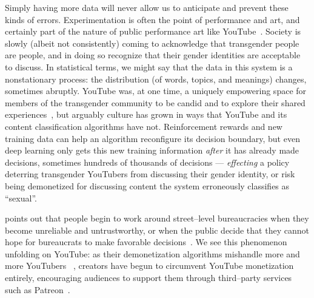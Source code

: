 \documentclass[street-level_algorithms]{subfiles}
\begin{document}
Simply having more data will never allow us to anticipate and prevent these kinds of errors.
Experimentation is often the point of performance and art, and
certainly part of the nature of public performance art like YouTube~\cite{cohen1998radical,mason1992street}.
Society is slowly (albeit not consistently) coming to acknowledge that transgender people are people,
and in doing so recognize that their gender identities are acceptable to discuss.
In statistical terms, we might say that
the data in this system is a nonstationary process:
the distribution (of words, topics, and meanings) changes, sometimes abruptly.
YouTube was, at one time, a uniquely empowering space for members of the transgender community
to be candid and to explore their shared experiences~\cite{ONeill2014,raun2016out}, but
arguably culture has grown in ways that YouTube and its content classification algorithms have not.
Reinforcement rewards and new training data can help an algorithm reconfigure its decision boundary, but
even deep learning only gets this new training information \textit{after}
it has already made decisions, sometimes hundreds of thousands of decisions
--- \textit{effecting} a policy deterring transgender YouTubers from discussing their gender identity,
or risk being demonetized for discussing content the system erroneously classifies as ``sexual''.

\citeauthor{lipsky1983street} points out that
people begin to work around street--level bureaucracies when they become unreliable and untrustworthy, or
when the public decide that they cannot hope for bureaucrats to make favorable decisions~\cite{lipsky1983street}.
We see this phenomenon unfolding on YouTube:
as their demonetization algorithms mishandle more and more YouTubers ~\cite{adpocalypseForbes,summers2018professors},
creators have begun to circumvent YouTube monetization entirely,
encouraging audiences to support them through third--party services such as Patreon~\cite{leppanen2017state}.


\onlyinsubfile{
  
  
}
\end{document}
